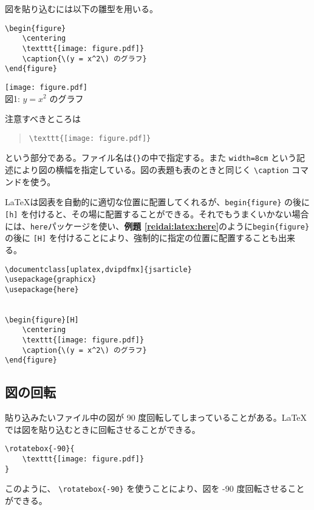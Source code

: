 図を貼り込むには以下の雛型を用いる。
\begin{reidai}
    \begin{verbatim}
\begin{figure}
    \centering
    \texttt{[image: figure.pdf]}
    \caption{\(y = x^2\) のグラフ}
\end{figure}
\end{verbatim}
\end{reidai}
\vspace*{-1.5em}
\begin{kekka}
    \centering
    \texttt{[image: figure.pdf]} \\
    図1: \(y = x^2\) のグラフ
\end{kekka} \noindent
注意すべきところは
\begin{quotation}
    \verb|\texttt{[image: figure.pdf]}|
\end{quotation}
という部分である。ファイル名は\texttt{\{\}}の中で指定する。また \texttt{width=8cm} という記述により図の横幅を指定している。図の表題も表のときと同じく \verb|\caption| コマンドを使う。

\LaTeX は図表を自動的に適切な位置に配置してくれるが、\verb|begin{figure}| の後に \texttt{[h]} を付けると、その場に配置することができる。それでもうまくいかない場合には、\texttt{here}パッケージを使い、\textbf{例題 \ref{reidai:latex:here}}のように\verb|begin{figure}| の後に \texttt{[H]} を付けることにより、強制的に指定の位置に配置することも出来る。
\begin{reidai}
    \label{reidai:latex:here}
    \begin{verbatim}
\documentclass[uplatex,dvipdfmx]{jsarticle}
\usepackage{graphicx}
\usepackage{here}


\begin{figure}[H]
    \centering
    \texttt{[image: figure.pdf]}
    \caption{\(y = x^2\) のグラフ}
\end{figure}

\end{verbatim}
\end{reidai}

\subsection{図の回転}
\label{sec:latex:rotate_pdf}

貼り込みたいファイル中の図が 90 度回転してしまっていることがある。\LaTeX では図を貼り込むときに回転させることができる。
\begin{reidai}
    \begin{verbatim}
\rotatebox{-90}{
    \texttt{[image: figure.pdf]}
}
\end{verbatim}
\end{reidai} \noindent
\vspace*{-1.5em}
\begin{kekka}
    \centering
\end{kekka} \noindent
このように、 \verb|\rotatebox{-90}| を使うことにより、図を -90 度回転させることができる。


